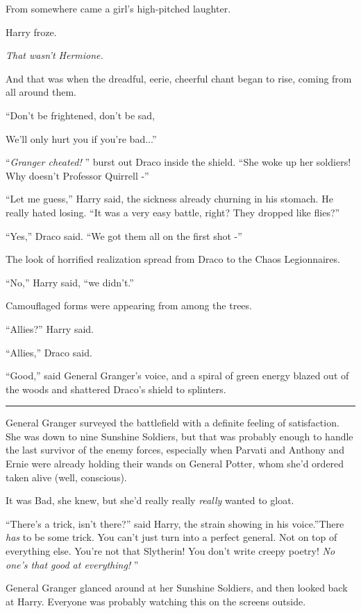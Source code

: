 From somewhere came a girl's high-pitched laughter.

Harry froze.

\emph{That wasn't Hermione.}

And that was when the dreadful, eerie, cheerful chant began to rise,
coming from all around them.

``Don't be frightened, don't be sad,

We'll only hurt you if you're bad...''

``\emph{Granger cheated!} '' burst out Draco inside the shield. ``She woke
up her soldiers! Why doesn't Professor Quirrell -''

``Let me guess,'' Harry said, the sickness already churning in his
stomach. He really hated losing. ``It was a very easy battle, right?
They dropped like flies?''

``Yes,'' Draco said. ``We got them all on the first shot -''

The look of horrified realization spread from Draco to the Chaos
Legionnaires.

``No,'' Harry said, ``we didn't.''

Camouflaged forms were appearing from among the trees.

``Allies?'' Harry said.

``Allies,'' Draco said.

``Good,'' said General Granger's voice, and a spiral of green energy
blazed out of the woods and shattered Draco's shield to splinters.

\begin{center}\rule{3in}{0.4pt}\end{center}

General Granger surveyed the battlefield with a definite feeling of
satisfaction. She was down to nine Sunshine Soldiers, but that was
probably enough to handle the last survivor of the enemy forces,
especially when Parvati and Anthony and Ernie were already holding their
wands on General Potter, whom she'd ordered taken alive (well,
conscious).

It was Bad, she knew, but she'd really really \emph{really} wanted to
gloat.

``There's a trick, isn't there?'' said Harry, the strain showing in his
voice.''There \emph{has} to be some trick. You can't just turn into a
perfect general. Not on top of everything else. You're not that
Slytherin! You don't write creepy poetry! \emph{No one's that good at
everything!} ''

General Granger glanced around at her Sunshine Soldiers, and then looked
back at Harry. Everyone was probably watching this on the screens
outside.

